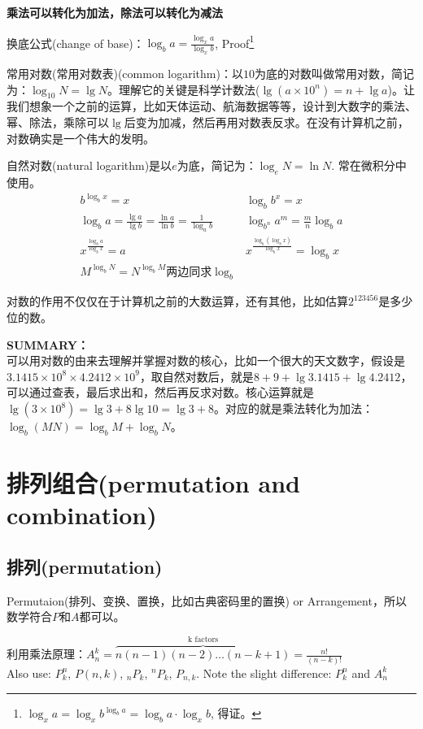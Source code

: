 \documentclass[../main.tex]{subfiles}
\begin{document}
\textbf{乘法可以转化为加法，除法可以转化为减法}

换底公式(change of base)：$\log_ba=\frac{\log_{x}a}{\log_{x}b}$, Proof\footnote{$\log_x a= \log_x b^{\log_b a} =\log _b a \cdot \log_x b$, 得证。}

常用对数(常用对数表)(common logarithm)：以$10$为底的对数叫做常用对数，简记为：$\log_{10}N = \lg N$。理解它的关键是科学计数法($\lg(a\times 10^n)=n+\lg a$)。让我们想象一个之前的运算，比如天体运动、航海数据等等，设计到大数字的乘法、幂、除法，乘除可以$\lg$后变为加减，然后再用对数表反求。在没有计算机之前，对数确实是一个伟大的发明。

自然对数(natural logarithm)是以$e$为底，简记为：$\log_eN=\ln N$. 常在微积分中使用。
\[
  \begin{array}{ll}
    b^{\log_b x}=x  &\log_b b^x = x \\
    \log_b a = \frac{\lg a}{\lg b} = \frac{\ln a}{\ln b}  = \frac{1}{\log_{a}b} & \log_{b^n}a^m=\frac{m}{n}\log_ba\\
    x^{\frac{\log_b{a}}{\log_b x}}=a & x^{\frac{\log_b(\log_b x)}{\log_b x}}=\log_b x\\
    M^{\log_b N}=N^{\log_b M}\mbox{两边同求}\log_{b}&
  \end{array}
\]

对数的作用不仅仅在于计算机之前的大数运算，还有其他，比如估算$2^{123456}$是多少位的数。

\textbf{SUMMARY：}\\
可以用对数的由来去理解并掌握对数的核心，比如一个很大的天文数字，假设是$3.1415\times 10^8 \times 4.2412\times 10^9$，取自然对数后，就是$8+9+\lg 3.1415+\lg4.2412$，可以通过查表，最后求出和，然后再反求对数。核心运算就是$\lg(3\times 10^8)=\lg3+8\lg10=\lg3+8$。对应的就是乘法转化为加法：$\log_b(MN)=\log_bM+\log_bN$。

\newpage
\section{排列组合(permutation and combination)}

\subsection{排列(permutation)}
Permutaion(排列、变换、置换，比如古典密码里的置换) or Arrangement，所以数学符合$P$和$A$都可以。

利用乘法原理：$A_{n}^{k}=\overbrace{n(n-1)(n-2)\ldots (n-k+1)}^{\text{k factors}}=\frac{n!}{(n-k)!}$\\
Also use:  $P^{n}_{k}$, $P(n,k)$, $_{n}P_{k}$, $^{n}P_{k}$, $P_{n,k}$. Note the slight difference: $P^{n}_{k}$ and $A_{n}^{k}$
\end{document}
